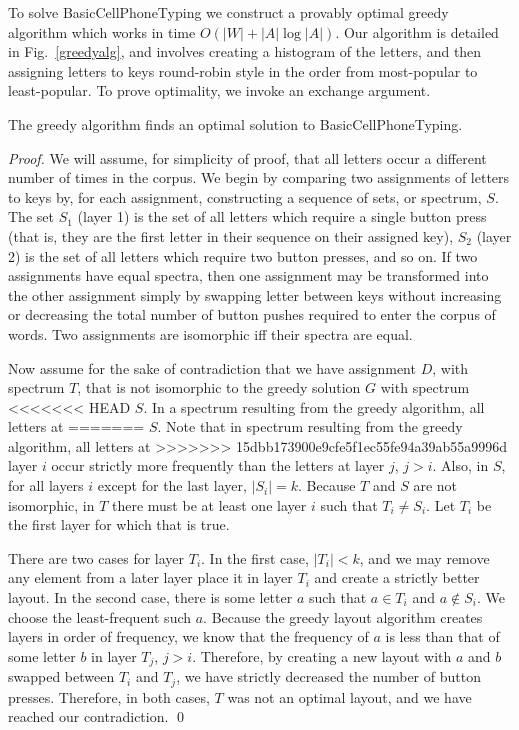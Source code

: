 \documentclass[runningheads]{llncs}
\begin{document}
\begin{prob}[{\sc
MinimumKeystrokes}]
{To solve {\sc BasicCellPhoneTyping} we construct a provably optimal
greedy algorithm which works in time $O(|W| + |A| \log |A|)$.  Our algorithm is
detailed in Fig.~\ref{greedyalg}, and involves creating a histogram of the
letters, and then assigning letters to keys round-robin style in the order from
most-popular to least-popular.  To prove optimality, we invoke an exchange argument.

\begin{theorem}
The greedy algorithm finds an optimal solution to {\sc BasicCellPhoneTyping}.
\label{basicthm}
\end{theorem}
\begin{proof}
We will assume, for simplicity of proof, that all letters occur a different
number of times in the corpus.  We begin by comparing two assignments of
letters to keys by, for each assignment, constructing a sequence of sets, or
spectrum, $S$.  The set $S_1$ (layer 1) is the set of all letters which require
a single button press (that is, they are the first letter in their sequence on
their assigned key), $S_2$ (layer 2) is the set of all letters which require
two button presses, and so on.  If two assignments have equal spectra, then one
assignment may be transformed into the other assignment simply by swapping
letter between keys without increasing or decreasing the total number of button
pushes required to enter the corpus of words.   Two assignments are isomorphic
iff their spectra are equal.

Now assume for the sake of contradiction that we have assignment $D$, with
spectrum $T$, that is not isomorphic to the greedy solution $G$ with spectrum
<<<<<<< HEAD
$S$.  In a spectrum resulting from the greedy algorithm, all letters at
=======
$S$.  Note that in spectrum resulting from the greedy algorithm, all letters at
>>>>>>> 15dbb173900e9cfe5f1ec55fe94a39ab55a9996d
layer $i$ occur strictly more frequently than the letters at layer $j$, $j >
i$.  Also, in $S$, for all layers $i$ except for the last layer, $|S_i| = k$.
Because $T$ and $S$ are not isomorphic, in $T$ there must be at least one layer
$i$ such that $T_i \neq S_i$.  Let $T_i$ be the first layer for which that is
true.

There are two cases for layer $T_i$.  In the first case, $|T_i| < k$, and we
may remove any element from a later layer place it in layer $T_i$ and create a
strictly better layout.  In the second case, there is some letter $a$ such that
$a \in T_i$ and $a \not\in S_i$.  We choose the least-frequent such $a$.
Because the greedy layout algorithm creates layers in order of frequency, we
know that the frequency of $a$ is less than that of some letter $b$ in layer
$T_j$, $j>i$.  Therefore, by creating a new layout with $a$ and $b$ swapped
between $T_i$ and $T_j$, we have strictly decreased the number of button
presses.  Therefore, in both cases, $T$ was not an optimal layout, and we have
reached our contradiction.  \qed \end{proof}

}
\end{prob}
\end{document}
